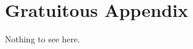 \documentclass[modernstyle,12pt]{sjsuthesis}
\theoremstyle{definition}
\begin{document}

\appendix	%

\chapter{Gratuitous Appendix}
Nothing to see here.

%


\end{document}
